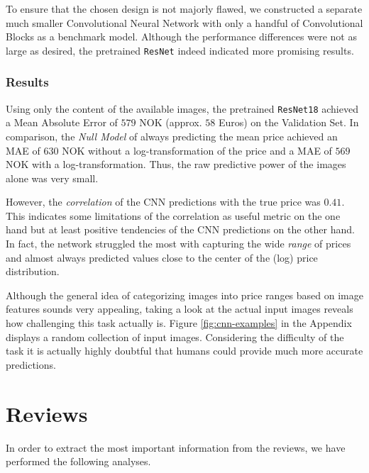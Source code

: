 \documentclass[12pt, letterpaper]{article}
\begin{document}
To ensure that the chosen design is not majorly flawed, we constructed a separate much smaller Convolutional Neural Network with only a handful of Convolutional Blocks as a benchmark model.
Although the performance differences were not as large as desired, the pretrained \texttt{ResNet} indeed indicated more promising results.


\subsubsection{Results}

Using only the content of the available images, the pretrained \texttt{ResNet18} achieved a Mean Absolute Error of $579$ NOK (approx. $58$ Euros) on the Validation Set.
In comparison, the \emph{Null Model} of always predicting the mean price achieved an MAE of $630$ NOK without a log-transformation of the price and a MAE of $569$ NOK with a log-transformation.
Thus, the raw predictive power of the images alone was very small.

However, the \emph{correlation} of the CNN predictions with the true price was $0.41$.
This indicates some limitations of the correlation as useful metric on the one hand but at least positive tendencies of the CNN predictions on the other hand.
In fact, the network struggled the most with capturing the wide \emph{range} of prices and almost always predicted values close to the center of the (log) price distribution.

Although the general idea of categorizing images into price ranges based on image features sounds very appealing, taking a look at the actual input images reveals how challenging this task actually is.
Figure \ref{fig:cnn-examples} in the Appendix displays a random collection of input images.
Considering the difficulty of the task it is actually highly doubtful that humans could provide much more accurate predictions.

\section{Reviews}

In order to extract the most important information from the reviews, we have performed the following analyses.
\end{document}
